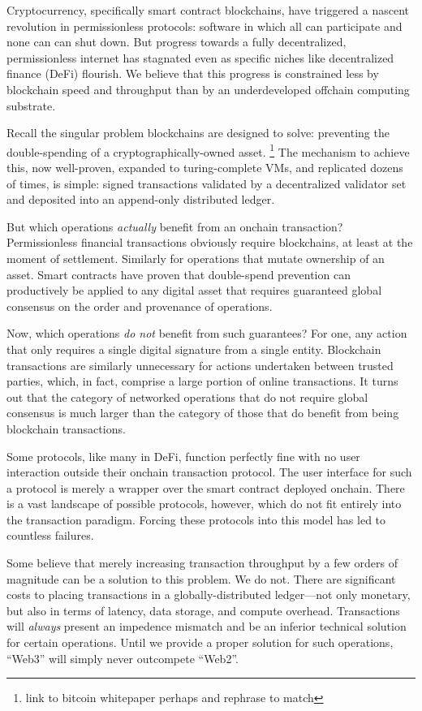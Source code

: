 \documentclass[runningheads]{llncs}
\begin{document}
Cryptocurrency, specifically smart contract blockchains, have triggered a nascent revolution in permissionless protocols: software in which all can participate and none can can shut down.
But progress towards a fully decentralized, permissionless internet has stagnated even as specific niches like decentralized finance (DeFi) flourish.
We believe that this progress is constrained less by blockchain speed and throughput than by an underdeveloped offchain computing substrate.

Recall the singular problem blockchains are designed to solve: preventing the double-spending of a cryptographically-owned asset.
\footnote{link to bitcoin whitepaper perhaps and rephrase to match}
The mechanism to achieve this, now well-proven, expanded to turing-complete VMs, and replicated dozens of times, is simple: signed transactions validated by a decentralized validator set and deposited into an append-only distributed ledger.

But which operations \textit{actually} benefit from an onchain transaction?
Permissionless financial transactions obviously require blockchains, at least at the moment of settlement.
Similarly for operations that mutate ownership of an asset.
Smart contracts have proven that double-spend prevention can productively be applied to any digital asset that requires guaranteed global consensus on the order and provenance of operations.

Now, which operations \textit{do not} benefit from such guarantees?
For one, any action that only requires a single digital signature from a single entity. %
Blockchain transactions are similarly unnecessary for actions undertaken between trusted parties, which, in fact, comprise a large portion of online transactions.
It turns out that the category of networked operations that do not require global consensus is much larger than the category of those that do benefit from being blockchain transactions.

Some protocols, like many in DeFi, function perfectly fine with no user interaction outside their onchain transaction protocol.
The user interface for such a protocol is merely a wrapper over the smart contract deployed onchain.
There is a vast landscape of possible protocols, however, which do not fit entirely into the transaction paradigm.
Forcing these protocols into this model has led to countless failures. %

Some believe that merely increasing transaction throughput by a few orders of magnitude can be a solution to this problem. %
We do not.
There are significant costs to placing transactions in a globally-distributed ledger—not only monetary, but also in terms of latency, data storage, and compute overhead.
Transactions will \textit{always} present an impedence mismatch and be an inferior technical solution for certain operations. %
Until we provide a proper solution for such operations, ``Web3'' will simply never outcompete ``Web2''.
\end{document}
